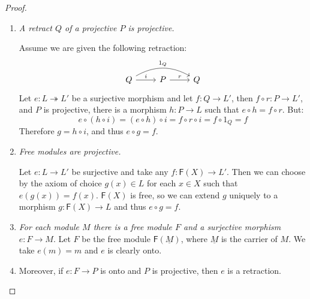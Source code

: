 \documentclass[8pt]{article}
\theoremstyle{definition}
\theoremstyle{definition}
\theoremstyle{definition}
\theoremstyle{definition}
\theoremstyle{definition}
\theoremstyle{definition}
\theoremstyle{definition}
\theoremstyle{definition}
\theoremstyle{definition}
\theoremstyle{definition}
\theoremstyle{definition}
\theoremstyle{definition}
\theoremstyle{definition}
\theoremstyle{definition}
\theoremstyle{question}
\begin{document}
\begin{proof}
\begin{enumerate}
\item \emph{A retract $Q$ of a projective $P$ is projective.}

Assume we are given the following retraction:
\[
\begin{tikzcd}
  Q \ar[r, "i"] \ar[rr, bend left=30, "1_Q"] & P \ar[r, "r"] & Q
\end{tikzcd}
\]
Let $e : L \twoheadrightarrow L'$ be a surjective morphism and let $f : Q \to L'$, then $f \circ r : P \to L'$,
and $P$ is projective, there is a morphism $h : P \to L$ such that $e \circ h = f \circ r$.
But:
\[
e \circ (h \circ i) = (e \circ h) \circ i = f \circ r \circ i = f \circ 1_Q = f
\]
Therefore $g = h \circ i$, and thus $e \circ g = f$.

\item \emph{Free modules are projective.}

Let $e : L \to L'$ be surjective and take any $f : \mathsf{F}(X) \to L'$. Then we can choose by the axiom of choice
$g(x) \in L$ for each $x \in X$ such that $e(g(x)) = f(x)$. $\mathsf{F}(X)$ is free, so we can extend $g$ uniquely to a
morphism $g : \mathsf{F}(X) \to L$ and thus $e \circ g = f$.

\item \emph{For each module $M$ there is a free module $F$ and a surjective morphism $e : F \to M$}.
Let $F$ be the free module $\mathsf{F}(\underline{M})$, where $\underline{M}$ is the carrier of $M$.
We take $e(m) = m$ and $e$ is clearly onto.

\item Moreover, if $e : F \to P$ is onto and $P$ is projective, then $e$ is a retraction.
\end{enumerate}
\end{proof}
\end{document}
